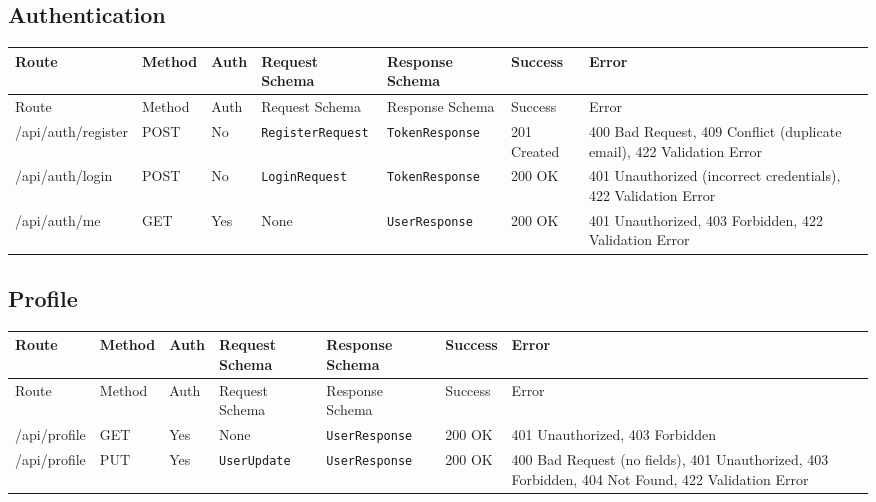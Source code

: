 \subsection{Authentication}
\begin{longtable}{p{3.2cm} p{1.7cm} p{2.2cm} p{3.6cm} p{3.6cm} p{1.8cm} p{1.8cm}}
\toprule
Route & Method & Auth & Request Schema & Response Schema & Success & Error \\
\midrule
\endfirsthead
\toprule
Route & Method & Auth & Request Schema & Response Schema & Success & Error \\
\midrule
\endhead
\bottomrule
\endfoot

/api/auth/register & POST & No & \texttt{RegisterRequest} & \texttt{TokenResponse} & 201 Created & 400 Bad Request, 409 Conflict (duplicate email), 422 Validation Error \\

/api/auth/login & POST & No & \texttt{LoginRequest} & \texttt{TokenResponse} & 200 OK & 401 Unauthorized (incorrect credentials), 422 Validation Error \\

/api/auth/me & GET & Yes & None & \texttt{UserResponse} & 200 OK & 401 Unauthorized, 403 Forbidden, 422 Validation Error \\
\end{longtable}

\subsection{Profile}
\begin{longtable}{p{3.2cm} p{1.7cm} p{2.2cm} p{3.6cm} p{3.6cm} p{1.8cm} p{1.8cm}}
\toprule
Route & Method & Auth & Request Schema & Response Schema & Success & Error \\
\midrule
\endfirsthead
\toprule
Route & Method & Auth & Request Schema & Response Schema & Success & Error \\
\midrule
\endhead
\bottomrule
\endfoot

/api/profile & GET & Yes & None & \texttt{UserResponse} & 200 OK & 401 Unauthorized, 403 Forbidden \\

/api/profile & PUT & Yes & \texttt{UserUpdate} & \texttt{UserResponse} & 200 OK & 400 Bad Request (no fields), 401 Unauthorized, 403 Forbidden, 404 Not Found, 422 Validation Error \\
\end{longtable}

